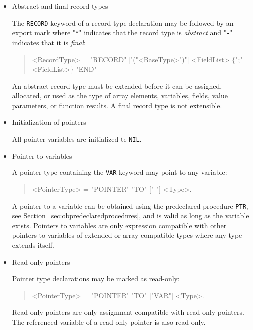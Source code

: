 \begin{itemize}
\item Abstract and final record types

The \texttt{RECORD} keyword of a record type declaration may be followed by an export mark where "\texttt{*}" indicates that the record type is \emph{abstract} and "\texttt{-}" indicates that it is \emph{final}:

\begin{quote}\begin{grammar}
<RecordType> = "RECORD" \changed{$[$"*"$\mid$"-"$]$} $[$"("<BaseType>")"$]$ <FieldList> $\{$";" <FieldList>$\}$ "END" \par
\end{grammar}\end{quote}

An abstract record type must be extended before it can be assigned, allocated, or used as the type of array elements, variables, fields, value parameters, or function results.
A final record type is not extensible.

\item Initialization of pointers

All pointer variables are initialized to \texttt{NIL}.

\item Pointer to variables

A pointer type containing the \texttt{VAR} keyword may point to any variable:

\begin{quote}\begin{grammar}
<PointerType> = "POINTER" "TO" \changed{$[$"VAR"$]$} $[$"-"$]$ <Type>.
\end{grammar}\end{quote}

A pointer to a variable can be obtained using the predeclared procedure \texttt{PTR}, see Section~\ref{sec:obpredeclaredprocedures}, and is valid as long as the variable exists.
Pointers to variables are only expression compatible with other pointers to variables of extended or array compatible types where any type extends itself.

\item Read-only pointers

Pointer type declarations may be marked as read-only:

\begin{quote}\begin{grammar}
<PointerType> = "POINTER" "TO" $[$"VAR"$]$ \changed{$[$"-"$]$} <Type>.
\end{grammar}\end{quote}

Read-only pointers are only assignment compatible with read-only pointers.
The referenced variable of a read-only pointer is also read-only.

\end{itemize}


